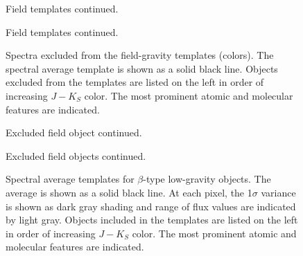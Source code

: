 \documentclass[12pt]{aastex6}
\begin{document}
\begin{figure}
  \caption{Field templates continued.}
\end{figure}

\begin{figure}
  \caption{Field templates continued.}
\end{figure}

\begin{figure}
  \caption{Spectra excluded from the field-gravity templates (colors). The spectral average template is shown as a solid black line. Objects excluded from the templates are listed on the left in order of increasing $J-K_S$ color. The most prominent atomic and molecular features are indicated.}
  \label{fig:field_excluded}
\end{figure}

\begin{figure}
  \caption{Excluded field object continued.}
\end{figure}

\begin{figure}
  \caption{Excluded field objects continued.}
\end{figure}

\clearpage



\clearpage



\clearpage
\begin{figure}
  \caption{Spectral average templates for $\beta$-type low-gravity objects. The average is shown as a solid black line. At each pixel, the 1$\sigma$ variance is shown as dark gray shading and range of flux values are indicated by light gray. Objects included in the templates are listed on the left in order of increasing $J-K_S$ color. The most prominent atomic and molecular features are indicated. }
  \label{fig:beta_templates}
\end{figure}
\end{document}
